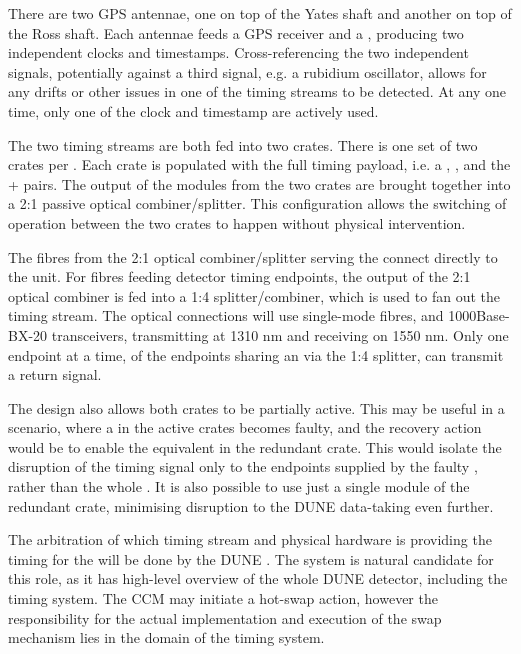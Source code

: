 \documentclass{dune}
\begin{document}
There are two GPS antennae, one on top of the Yates shaft and another on top of the Ross shaft. Each antennae feeds a GPS receiver and a , producing two independent  clocks and timestamps. Cross-referencing the two independent signals, potentially against a third signal, e.g. a rubidium oscillator, allows for any drifts or other issues in one of the  timing streams to be detected. At any one time, only one of the  clock and timestamp are actively used.

The two  timing streams are both fed into two  crates. There is one set of two  crates per . Each crate is populated with the full timing  payload, i.e. a , , and the + pairs. The output of the  modules from the two  crates are brought together into a 2:1 passive optical combiner/splitter. This configuration allows the switching of operation between the two crates to happen without physical intervention. 

The fibres from the 2:1 optical combiner/splitter serving the  connect directly to the unit. For fibres feeding detector timing endpoints, the output of the 2:1 optical combiner is fed into a 1:4 splitter/combiner, which is used to fan out the  timing stream. The optical connections will use single-mode fibres, and 1000Base-BX-20  transceivers, transmitting at 1310 nm and receiving on 1550 nm. Only one endpoint at a time, of the endpoints sharing an  via the 1:4 splitter, can transmit a return signal.

The design also allows both crates to be partially active. This may be useful in a scenario, where a  in the active crates becomes faulty, and the recovery action would be to enable the equivalent  in the redundant crate. This would isolate the disruption of the timing signal only to the endpoints supplied by the faulty , rather than the whole . It is also possible to use just a single  module of the redundant crate, minimising disruption to the DUNE data-taking even further.

The arbitration of which  timing stream and physical hardware is providing the timing for the  will be done by the DUNE . The  system is natural candidate for this role, as it has high-level overview of the whole DUNE detector, including the timing system. The CCM may initiate a hot-swap action, however the responsibility for the actual implementation and execution of the swap mechanism lies in the domain of the timing system.
\end{document}
